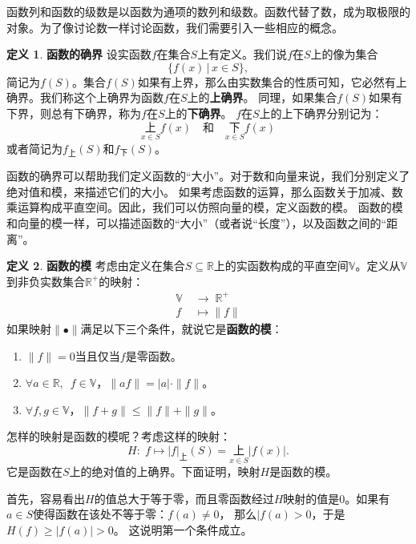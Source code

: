 \documentclass[12pt,UTF8]{ctexbook}
\theoremstyle{definition}
\newtheorem{df}{定义}[section]
\theoremstyle{plain}
\begin{document}
\begin{appendix}
函数列和函数的级数是以函数为通项的数列和级数。函数代替了数，成为取极限的对象。为了像讨论数一样讨论函数，我们需要引入一些相应的概念。

\begin{df}{\textbf{函数的确界}}
    设实函数$f$在集合$S$上有定义。我们说$f$在$S$上的像为集合
    $$ \{f(x) \,|\, x\in S\}, $$
    简记为$f(S)$。集合$f(S)$如果有上界，那么由实数集合的性质可知，它必然有上确界。我们称这个上确界为函数$f$在$S$上的\textbf{上确界}。
    同理，如果集合$f(S)$如果有下界，则总有下确界，称为$f$在$S$上的\textbf{下确界}。
    $f$在$S$上的上下确界分别记为：
    $$ \underset{x\in S}{\text{上}} f(x) \quad \mbox{和} \quad \underset{x\in S}{\text{下}} f(x)$$
    或者简记为$f_{\text{上}}(S)$和$f_{\text{下}}(S)$。
\end{df}

函数的确界可以帮助我们定义函数的“大小”。对于数和向量来说，我们分别定义了绝对值和模，来描述它们的大小。
如果考虑函数的运算，那么函数关于加减、数乘运算构成平直空间。因此，我们可以仿照向量的模，定义函数的模。
函数的模和向量的模一样，可以描述函数的“大小”（或者说“长度”），以及函数之间的“距离”。
\begin{df}{\textbf{函数的模}}
    考虑由定义在集合$S\subseteq\mathbb{R}$上的实函数构成的平直空间$\mathbb{V}$。定义从$\mathbb{V}$到非负实数集合$\mathbb{R}^+$的映射：
    \begin{align*}
        \mathbb{V} \; &\rightarrow  \; \mathbb{R}^+ \\
        f &\mapsto \|f\|
    \end{align*}
    如果映射$\|\bullet \|$满足以下三个条件，就说它是\textbf{函数的模}：
    \begin{enumerate}
        \item $\|f\| = 0$当且仅当$f$是零函数。
        \item $\forall a\in\mathbb{R},\,\,\,f \in \mathbb{V}$，$\|af\| = |a| \cdot \|f\|$。
        \item $\forall f,g \in \mathbb{V}$，$\|f + g\| \leqslant \|f\| + \|g\|$。
    \end{enumerate}
\end{df}

怎样的映射是函数的模呢？考虑这样的映射：
$$ H:\; f \mapsto |f|_{\text{上}}(S) = \underset{x\in S}{\text{上}} |f(x)|. $$
它是函数在$S$上的绝对值的上确界。下面证明，映射$H$是函数的模。

首先，容易看出$H$的值总大于等于零，而且零函数经过$H$映射的值是$0$。如果有$a\in S$使得函数在该处不等于零：$f(a)\neq 0$，
那么$|f(a)>0$，于是$H(f) \geqslant |f(a)| > 0$。
这说明第一个条件成立。


\end{appendix}
\end{document}
